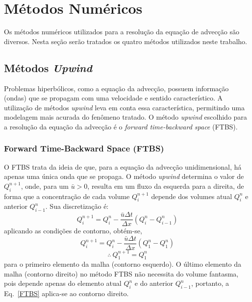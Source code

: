 \section{Métodos Numéricos}
Os métodos numéricos utilizados para a resolução da equação de advecção são
diversos. Nesta seção serão tratados os quatro métodos utilizados neste
trabalho.

\subsection{Métodos \textit{Upwind}}
Problemas hiperbólicos, como a equação da advecção, possuem informação (ondas)
que se propagam com uma velocidade e sentido característico. A utilização de
métodos \textit{upwind} leva em conta essa característica, permitindo uma
modelagem mais acurada do fenômeno tratado. O método \textit{upwind} escolhido
para a resolução da equação da advecção é o \textit{forward time-backward space}
(FTBS).

\subsubsection{Forward Time-Backward Space (FTBS)}
O FTBS trata da ideia de que, para a equação da advecção unidimensional, há
apenas uma única onda que se propaga. O método \textit{upwind} determina o
valor de $Q_i^{n+1}$, onde, para um $\bar{u} > 0$, resulta em um fluxo da
esquerda para a direita, de forma que a concentração de cada volume $Q_i^{n+1}$
depende dos volumes atual $Q_i^n$ e anterior $Q_{i-1}^n$. Sua discretização é:
\begin{equation}\label{FTBS}
    Q_i^{n+1} = Q_i^n - \frac{\bar{u}\Delta t}{\Delta x} \left(
        Q_i^n - Q_{i-1}^n
    \right)
\end{equation}
aplicando as condições de contorno, obtém-se,
\[
    Q_i^{n+1} = Q_i^n - \frac{\bar{u}\Delta t}{\Delta x} \left(
        Q_1^n - Q_1^n
    \right)
\]
\begin{equation}
    \therefore\ Q_1^{n+1} = Q_1^n
\end{equation}
para o primeiro elemento da malha (contorno esquerdo). O último elemento da
malha (contorno direito) no método FTBS não necessita do volume fantasma, pois
depende apenas do elemento atual $Q_i^n$ e do anterior $Q_{i-1}^n$, portanto, a
Eq.\ \ref{FTBS} aplica-se ao contorno direito.

